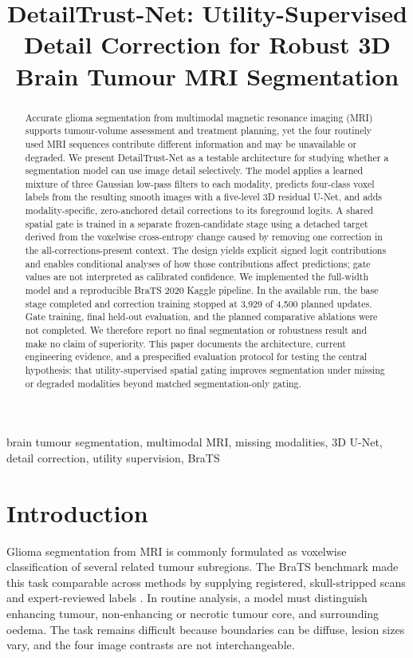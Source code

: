 \documentclass[conference]{IEEEtran}
\title{DetailTrust-Net: Utility-Supervised Detail Correction for Robust 3D Brain Tumour MRI Segmentation}
\author{\IEEEauthorblockN{Samiul Seikh, Vikash Kumar Vivek, Krish Garg, Lakshay Pal, Shena}
\IEEEauthorblockA{Netaji Subhas University of Technology (NSUT), New Delhi, India}}
\begin{document}
\maketitle

\begin{abstract}
Accurate glioma segmentation from multimodal magnetic resonance imaging (MRI) supports tumour-volume assessment and treatment planning, yet the four routinely used MRI sequences contribute different information and may be unavailable or degraded. We present DetailTrust-Net as a testable architecture for studying whether a segmentation model can use image detail selectively. The model applies a learned mixture of three Gaussian low-pass filters to each modality, predicts four-class voxel labels from the resulting smooth images with a five-level 3D residual U-Net, and adds modality-specific, zero-anchored detail corrections to its foreground logits. A shared spatial gate is trained in a separate frozen-candidate stage using a detached target derived from the voxelwise cross-entropy change caused by removing one correction in the all-corrections-present context. The design yields explicit signed logit contributions and enables conditional analyses of how those contributions affect predictions; gate values are not interpreted as calibrated confidence. We implemented the full-width model and a reproducible BraTS 2020 Kaggle pipeline. In the available run, the base stage completed and correction training stopped at 3,929 of 4,500 planned updates. Gate training, final held-out evaluation, and the planned comparative ablations were not completed. We therefore report no final segmentation or robustness result and make no claim of superiority. This paper documents the architecture, current engineering evidence, and a prespecified evaluation protocol for testing the central hypothesis: that utility-supervised spatial gating improves segmentation under missing or degraded modalities beyond matched segmentation-only gating.
\end{abstract}

\begin{IEEEkeywords}
brain tumour segmentation, multimodal MRI, missing modalities, 3D U-Net, detail correction, utility supervision, BraTS
\end{IEEEkeywords}

\section{Introduction}
Glioma segmentation from MRI is commonly formulated as voxelwise classification of several related tumour subregions. The BraTS benchmark made this task comparable across methods by supplying registered, skull-stripped scans and expert-reviewed labels \cite{menze2015,bakas2017}. In routine analysis, a model must distinguish enhancing tumour, non-enhancing or necrotic tumour core, and surrounding oedema. The task remains difficult because boundaries can be diffuse, lesion sizes vary, and the four image contrasts are not interchangeable.
\end{document}
